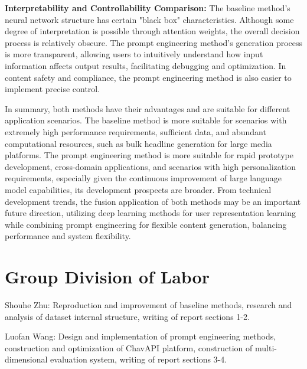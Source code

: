 \documentclass[10pt,a4paper]{article}
\begin{document}
\textbf{Interpretability and Controllability Comparison:} The baseline method's neural network structure has certain "black box" characteristics. Although some degree of interpretation is possible through attention weights, the overall decision process is relatively obscure. The prompt engineering method's generation process is more transparent, allowing users to intuitively understand how input information affects output results, facilitating debugging and optimization. In content safety and compliance, the prompt engineering method is also easier to implement precise control.

In summary, both methods have their advantages and are suitable for different application scenarios. The baseline method is more suitable for scenarios with extremely high performance requirements, sufficient data, and abundant computational resources, such as bulk headline generation for large media platforms. The prompt engineering method is more suitable for rapid prototype development, cross-domain applications, and scenarios with high personalization requirements, especially given the continuous improvement of large language model capabilities, its development prospects are broader. From technical development trends, the fusion application of both methods may be an important future direction, utilizing deep learning methods for user representation learning while combining prompt engineering for flexible content generation, balancing performance and system flexibility.

\section{Group Division of Labor}
Shouhe Zhu: Reproduction and improvement of baseline methods, research and analysis of dataset internal structure, writing of report sections 1-2.

Luofan Wang: Design and implementation of prompt engineering methods, construction and optimization of ChavAPI platform, construction of multi-dimensional evaluation system, writing of report sections 3-4.
\end{document}
